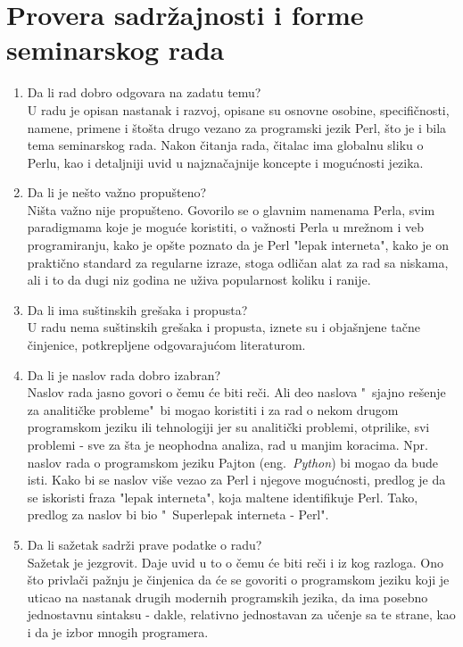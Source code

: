 \documentclass[a4paper]{report}
\begin{document}
\section{Provera sadržajnosti i forme seminarskog rada}

\begin{enumerate}
\item Da li rad dobro odgovara na zadatu temu?\\
U radu je opisan nastanak i razvoj, opisane su osnovne osobine, specifičnosti, namene, primene i štošta drugo vezano za programski jezik Perl, što je i bila tema seminarskog rada. Nakon čitanja rada, čitalac ima globalnu sliku o Perlu, kao i detaljniji uvid u najznačajnije koncepte i mogućnosti jezika.
\item Da li je nešto važno propušteno?\\
Ništa važno nije propušteno. Govorilo se o glavnim namenama Perla, svim paradigmama koje je moguće koristiti, o važnosti Perla u mrežnom i veb programiranju, kako je opšte poznato da je Perl "lepak interneta", kako je on praktično standard za regularne izraze, stoga odličan alat za rad sa niskama, ali i to da dugi niz godina ne uživa popularnost koliku i ranije.
\item Da li ima suštinskih grešaka i propusta?\\
U radu nema suštinskih grešaka i propusta, iznete su i objašnjene tačne činjenice, potkrepljene odgovarajućom literaturom.
\item Da li je naslov rada dobro izabran?\\
Naslov rada jasno govori o čemu će biti reči. Ali deo naslova "\ sjajno rešenje za analitičke probleme"\ bi mogao koristiti i za rad o nekom drugom programskom jeziku ili tehnologiji jer su analitički problemi, otprilike, svi problemi - sve za šta je neophodna analiza, rad u manjim koracima. Npr. naslov rada o programskom jeziku Pajton (eng.~{\em Python}) bi mogao da bude isti. Kako bi se naslov više vezao za Perl i njegove mogućnosti, predlog je da se iskoristi fraza "lepak interneta", koja maltene identifikuje Perl. Tako, predlog za naslov bi bio "\ Superlepak interneta - Perl".
\item Da li sažetak sadrži prave podatke o radu?\\
Sažetak je jezgrovit. Daje uvid u to o čemu će biti reči i iz kog razloga. Ono što privlači pažnju je činjenica da će se govoriti o programskom jeziku koji je uticao na nastanak drugih modernih programskih jezika, da ima posebno jednostavnu sintaksu - dakle, relativno jednostavan za učenje sa te strane, kao i da je izbor mnogih programera.

\end{enumerate}
\end{document}
